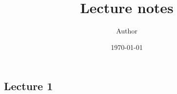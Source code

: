 \documentclass[11pt, reqno]{article}
\title{Lecture notes}
\author{Author}
\date{\today}
\begin{document}
\maketitle

\begin{abstract}
    \lipsum[1]
\end{abstract}

\tableofcontents

\begin{adjustwidth}{5cm}{0cm} %
%
\section{Lecture 1}

%
\end{adjustwidth}

\nocite{*} %


\end{document}
